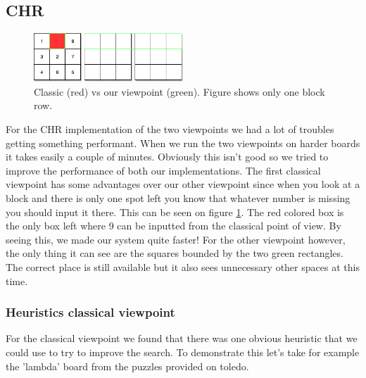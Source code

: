 \documentclass{report}
\begin{document}
\subsection{CHR}
\begin{figure}[h]
\centering
\includegraphics[width=0.5\textwidth]{classicvsour}
\caption{Classic (red) vs our viewpoint (green). Figure shows only one block row.}
\label{fig:classic_vs_own}
\end{figure}

For the CHR implementation of the two viewpoints we had a lot of troubles getting something performant. When we run the two viewpoints on harder boards it takes easily a couple of minutes. Obviously this isn't good so we tried to improve the performance of both our implementations. The first classical viewpoint has some advantages over our other viewpoint since when you look at a block and there is only one spot left you know that whatever number is missing you should input it there. This can be seen on figure \ref{fig:classic_vs_own}. The red colored box is the only box left where 9 can be inputted from the classical point of view. By seeing this, we made our system quite faster! For the other viewpoint however, the only thing it can see are the squares bounded by the two green rectangles. The correct place is still available but it also sees unnecessary other spaces at this time.

\subsubsection{Heuristics classical viewpoint}
For the classical viewpoint we found that there was one obvious heuristic that we could use to try to improve the search.
To demonstrate this let's take for example the 'lambda' board from the puzzles provided on toledo.
\end{document}

